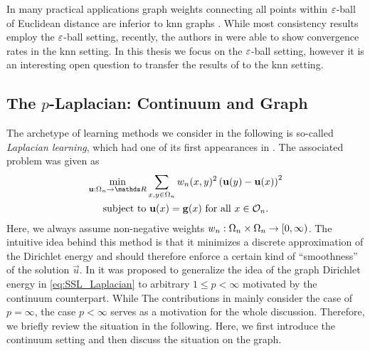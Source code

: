 %
%
%
\begin{remark}{}{}
In many practical applications graph weights connecting all points within $\varepsilon$-ball of Euclidean distance are inferior to knn graphs \cite{calder2020poisson, flores2019algorithms, calder2022improved}. While most consistency results employ the $\varepsilon$-ball setting, recently, the authors in \cite{calder2022improved} were able to show convergence rates in the knn setting. In this thesis we focus on the $\varepsilon$-ball setting, however it is an interesting open question to transfer the results of \cite{roith2022continuum, bungert2021uniform, bungert2022ratio} to the knn setting.
\end{remark}
%
%
%
%
\subsection{The $p$-Laplacian: Continuum and Graph}\label{sec:pLap}
%
%
The archetype of learning methods we consider in the following is so-called \emph{Laplacian learning}, which had one of its first appearances in 
\cite{zhu2003semi}. The associated problem was given as
%
\begin{gather}\label{eq:SSL_Laplacian}
	\begin{gathered}
		\min_{\vec u:\domain_n\to\R} \sum_{x,y\in\domain_n} w_n(x,y)^2 
		\left(\vec u(y) - \vec u(x) \right)^2\\
		\text{subject to } \vec u(x) = \vec g(x) \text{ for all } x\in\conset_n.
	\end{gathered}
\end{gather}
%
%
%
Here, we always assume non-negative weights $w_n:\Omega_n\times\Omega_n\to[0,\infty)$. The intuitive idea behind this method is that it minimizes a discrete approximation of the Dirichlet energy and should therefore enforce a certain kind of \enquote{smoothness} of the solution $\vec u$. In \cite{zhou2005regularization} it was proposed to generalize the idea of the graph Dirichlet energy in \cref{eq:SSL_Laplacian} to arbitrary $1\leq p < \infty$ motivated by the continuum counterpart. While The contributions in \cite{roith2022continuum, bungert2021uniform, bungert2022ratio} mainly consider the case of $p=\infty$, the case $p<\infty$ serves as a  motivation for the whole discussion. Therefore, we briefly review the situation in the following. Here, we first introduce the continuum setting and then discuss the situation on the graph.
%
%
%
%
